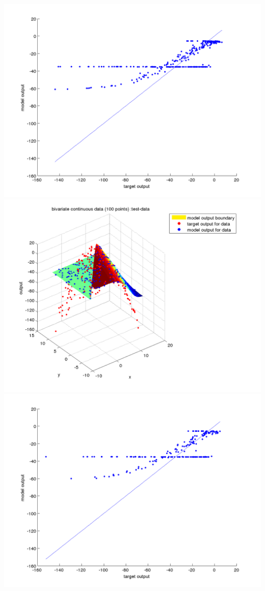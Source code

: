 \documentclass[fleqn]{article}
\begin{document}
\includegraphics[scale=0.4]{./pics/bivariate100/_2_4/_2_4_epoch_10_validation-data_scatter2d}
\includegraphics[scale=0.4]{./pics/bivariate100/_2_4/_2_4_epoch_10_test-data_scatter3d}
\includegraphics[scale=0.4]{./pics/bivariate100/_2_4/_2_4_epoch_10_test-data_scatter2d}
\end{document}
